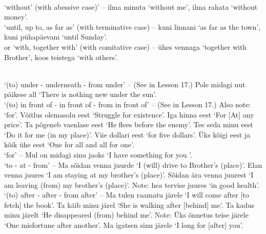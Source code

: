 \newSection {} \\

 `without' (with abessive case)’ -- ilma minuta `without me', ilma rahata `without money'. \\

 `until, up to, as far as' (with terminative case) -- kuni linnani `as far as the town', kuni pühapäevani `until Sunday'. \\

 or  `with, together with' (with comitative case) -- ühes vennaga `together with Brother', koos teistega `with others'.


\newSection {} \\

 `(to) under - underneath - from under' -- (See  in Lesson 17.) Pole midagi uut päikese all `There is nothing new under the sun'. \\

 `(to) in front of - in front of - from in front of' -- (See  in Lesson 17.) Also note:  `for'. Võitlus olemasolu eest `Struggle for existence'. Iga hinna eest `For [At] any price'. Ta põgeneb vaenlase eest `He flees before the enemy'. Tee seda minu eest `Do it for me (in my place)'. Viie dollari eest `for five dollars'. Üks kõigi eest ja kõik ühe eest `One for all and all for one'. \\

 `for' -- Mul on midagi sinu jaoks `I have something for you \sing'. \\

 `to - at - from' -- Ma sõidan venna juurde `I (will) drive to Brother's (place)'. Elan venna juures `I am staying at my brother's (place)'. Sõidan ära venna juurest `I am leaving (from) my brother's (place)'. Note: hea tervise juures `in good health'. \\

 `(to) after - after - from after' -- Ma tulen raamatu järele `I will come after [to fetch] the book'. Ta käib minu järel `She is walking after [behind] me'. Ta kadus minu järelt `He disappeared (from) behind me'. Note: Üks õnnetus teise järele `One misfortune after another'. Ma igatsen sinu järele `I long for [after] you'. \\

